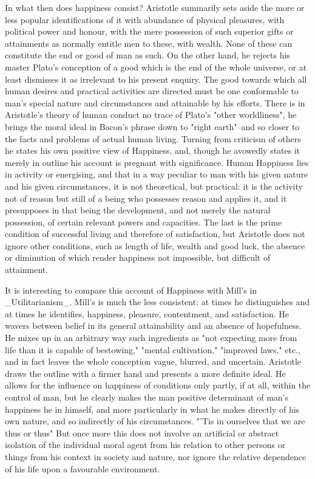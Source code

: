 In what then does happiness consist? Aristotle summarily sets aside the
more or less popular identifications of it with abundance of physical
pleasures, with political power and honour, with the mere possession of
such superior gifts or attainments as normally entitle men to these,
with wealth. None of these can constitute the end or good of man as
such. On the other hand, he rejects his master Plato's conception of a
good which is the end of the whole universe, or at least dismisses it
as irrelevant to his present enquiry. The good towards which all human
desires and practical activities are directed must be one conformable to
man's special nature and circumstances and attainable by his efforts.
There is in Aristotle's theory of human conduct no trace of Plato's
"other worldliness", he brings the moral ideal in Bacon's phrase down to
"right earth"--and so closer to the facts and problems of actual human
living. Turning from criticism of others he states his own positive view
of Happiness, and, though he avowedly states it merely in outline his
account is pregnant with significance. Human Happiness lies in activity
or energising, and that in a way peculiar to man with his given nature
and his given circumstances, it is not theoretical, but practical: it is
the activity not of reason but still of a being who possesses reason and
applies it, and it presupposes in that being the development, and
not merely the natural possession, of certain relevant powers and
capacities. The last is the prime condition of successful living
and therefore of satisfaction, but Aristotle does not ignore other
conditions, such as length of life, wealth and good luck, the absence or
diminution of which render happiness not impossible, but difficult of
attainment.

It is interesting to compare this account of Happiness with Mill's
in _Utilitarianism_. Mill's is much the less consistent: at times
he distinguishes and at times he identifies, happiness, pleasure,
contentment, and satisfaction. He wavers between belief in its general
attainability and an absence of hopefulness. He mixes up in an arbitrary
way such ingredients as "not expecting more from life than it is capable
of bestowing," "mental cultivation," "improved laws," etc., and in fact
leaves the whole conception vague, blurred, and uncertain. Aristotle
draws the outline with a firmer hand and presents a more definite ideal.
He allows for the influence on happiness of conditions only partly, if
at all, within the control of man, but he clearly makes the man positive
determinant of man's happiness he in himself, and more particularly
in what he makes directly of his own nature, and so indirectly of his
circumstances. "'Tis in ourselves that we are thus or thus" But once
more this does not involve an artificial or abstract isolation of the
individual moral agent from his relation to other persons or things from
his context in society and nature, nor ignore the relative dependence of
his life upon a favourable environment.

